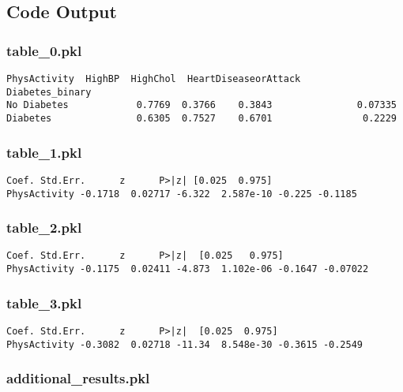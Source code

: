 \documentclass[11pt]{article}
\begin{document}
\subsection{Code Output}

\subsubsection*{table\_0.pkl}

\begin{Verbatim}[tabsize=4]
                 PhysActivity  HighBP  HighChol  HeartDiseaseorAttack
Diabetes_binary
No Diabetes            0.7769  0.3766    0.3843               0.07335
Diabetes               0.6305  0.7527    0.6701                0.2229
\end{Verbatim}

\subsubsection*{table\_1.pkl}

\begin{Verbatim}[tabsize=4]
               Coef. Std.Err.      z      P>|z| [0.025  0.975]
PhysActivity -0.1718  0.02717 -6.322  2.587e-10 -0.225 -0.1185
\end{Verbatim}

\subsubsection*{table\_2.pkl}

\begin{Verbatim}[tabsize=4]
               Coef. Std.Err.      z      P>|z|  [0.025   0.975]
PhysActivity -0.1175  0.02411 -4.873  1.102e-06 -0.1647 -0.07022
\end{Verbatim}

\subsubsection*{table\_3.pkl}

\begin{Verbatim}[tabsize=4]
               Coef. Std.Err.      z      P>|z|  [0.025  0.975]
PhysActivity -0.3082  0.02718 -11.34  8.548e-30 -0.3615 -0.2549
\end{Verbatim}

\subsubsection*{additional\_results.pkl}
\end{document}
